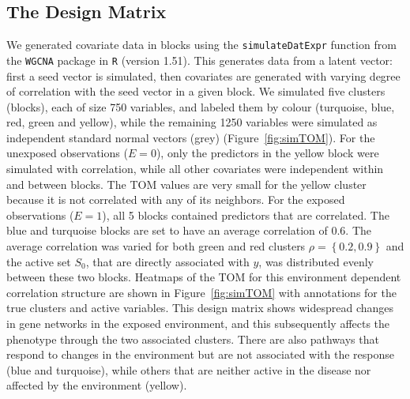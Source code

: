 \subsection{The Design Matrix}
We generated covariate data in blocks using the \texttt{simulateDatExpr} function from the \texttt{WGCNA} package in \texttt{R} (version 1.51). This generates data from a latent vector:  first a seed vector is simulated, then covariates are generated with varying degree of correlation with the seed vector in a given block. We simulated five clusters (blocks), each of size 750 variables, and labeled them by colour (turquoise, blue, red, green and yellow), while the remaining 1250 variables were simulated as independent standard normal vectors (grey) (Figure~\ref{fig:simTOM}). For the unexposed observations ($E=0$), only the predictors in the yellow block were simulated with correlation, while all other covariates were independent within and between blocks. The TOM values are very small for the yellow cluster because it is not correlated with any of its neighbors. For the exposed observations ($E=1$), all 5 blocks contained predictors that are correlated. The blue and turquoise blocks are set to have an average correlation of 0.6. The average correlation was varied for both green and red clusters $\rho = \left\lbrace 0.2, 0.9 \right\rbrace$ and the active set $S_0$, that are directly associated with $y$, was distributed evenly between these two blocks. Heatmaps of the TOM for this environment dependent correlation structure are shown in Figure~\ref{fig:simTOM} with annotations for the true clusters and active variables. This design matrix shows widespread changes in gene networks in the exposed environment, and this subsequently affects the phenotype through the two associated clusters. There are also pathways that respond to changes in the environment but are not associated with the response (blue and turquoise), while others that are neither active in the disease nor affected by the environment (yellow).


\begin{comment}
\begin{figure}[h]
	\texttt{[image: figure3.eps]}
	\caption{Topological overlap matrices (TOM) of simulated predictors based on subjects with (a) $E=0$, (b) $E=1$, (c) their absolute difference and (d) all subjects. Dendrograms are from hierarchical clustering (average linkage) of one minus the TOM for a, b, and d and the euclidean distance for c.   Some variables in the red and green clusters are associated with the outcome variable. The \textit{module} annotation represents the true cluster membership for each predictor, and the \textit{active} annotation represents the truly associated predictors with the response.}
	\label{fig:simTOM}
\end{figure}
\end{comment}


